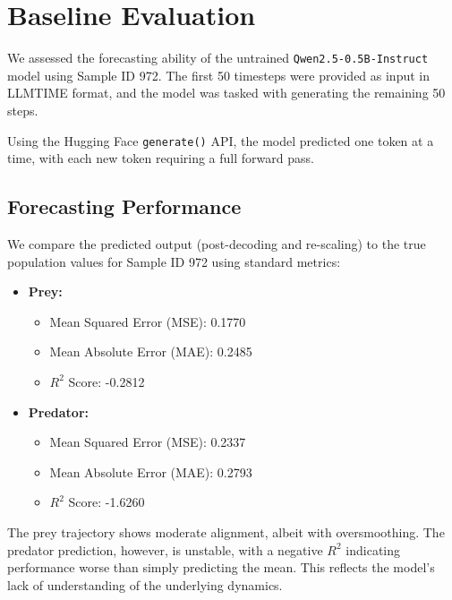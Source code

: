 \documentclass[a4paper,12pt]{article}
\begin{document}
  
\section{Baseline Evaluation}

We assessed the forecasting ability of the untrained \texttt{Qwen2.5-0.5B-Instruct} model using Sample ID 972. The first 50 timesteps were provided as input in LLMTIME format, and the model was tasked with generating the remaining 50 steps.

Using the Hugging Face \texttt{generate()} API, the model predicted one token at a time, with each new token requiring a full forward pass.

  \subsection*{Forecasting Performance}
  
  We compare the predicted output (post-decoding and re-scaling) to the true population values for Sample ID 972 using standard metrics:
  
  \begin{itemize}
    \item \textbf{Prey:}
      \begin{itemize}
        \item Mean Squared Error (MSE): 0.1770
        \item Mean Absolute Error (MAE): 0.2485
        \item $R^2$ Score: -0.2812
      \end{itemize}
    \item \textbf{Predator:}
      \begin{itemize}
        \item Mean Squared Error (MSE): 0.2337
        \item Mean Absolute Error (MAE): 0.2793
        \item $R^2$ Score: -1.6260
      \end{itemize}
  \end{itemize}
  
  The prey trajectory shows moderate alignment, albeit with oversmoothing. The predator prediction, however, is unstable, with a negative $R^2$ indicating performance worse than simply predicting the mean. This reflects the model’s lack of understanding of the underlying dynamics.
  
\end{document}
